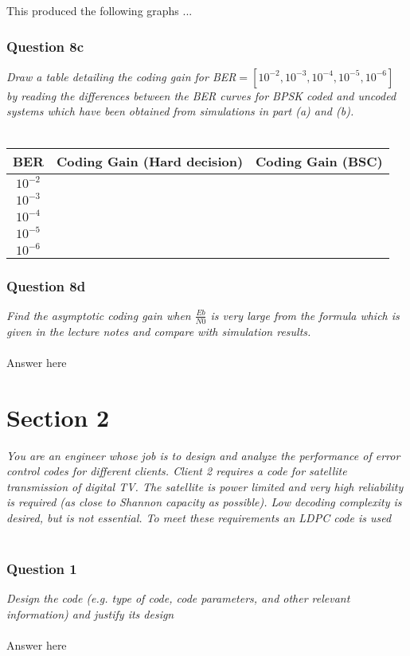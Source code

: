 \documentclass[a4paper]{article}
\begin{document}
This produced the following graphs ... \\

\subsubsection*{Question 8c} \textit{Draw a table detailing the coding gain for BER$= [10^{−2}, 10^{−3}, 10^{−4} , 10^{−5} , 10^{−6} ]$ by reading the differences between the BER curves for BPSK coded and uncoded systems which have been obtained from simulations in part (a) and (b).} \\
\\
\begin{tabular}{| c | c | c |}
\hline
BER & Coding Gain (Hard decision) & Coding Gain (BSC) \\
\hline
$10^{-2}$ & & \\
\hline
$10^{-3}$ & & \\
\hline
$10^{-4}$ & & \\
\hline
$10^{-5}$ & & \\
\hline
$10^{-6}$ & & \\
\hline
\end{tabular}

\subsubsection*{Question 8d} \textit{Find the asymptotic coding gain when $\frac{Eb}{N0}$ is very large from the formula which is given in the lecture notes and compare with simulation results.} \\
\\
Answer here \\

\section*{Section 2}

\textit{You are an engineer whose job is to design and analyze the performance of error control codes for different clients. Client 2 requires a code for satellite transmission of digital TV. The satellite is power limited and very high reliability is required (as close to Shannon capacity as possible). Low decoding complexity is desired, but is not essential. To meet these requirements an LDPC code is used} \\
\\
\subsubsection*{Question 1} \textit{Design the code (e.g. type of code, code parameters, and other relevant information) and justify its design}\\
\\
Answer here \\
\end{document}
